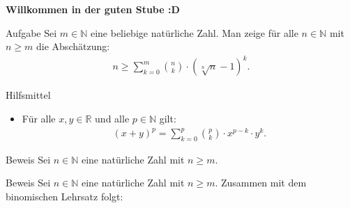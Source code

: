 \documentclass[10pt]{beamer}
\title{}
\author{Artur's Mathematikstübchen}
\date{}
\def\bN{\mathbb{N}}
\def\bR{\mathbb{R}}
\begin{document}

\begin{frame}
    \begin{center}
        \textbf{\huge Willkommen in der guten Stube \newline \newline :D}
    \end{center}
\end{frame}




\begin{frame}{}
    \begin{alertblock}{Aufgabe}
        Sei \( m \in \mathbb{N} \) eine beliebige natürliche Zahl. Man zeige für alle \( n \in \bN \) mit \( n \geq m \) die Abschätzung:
        \begin{align*}
            n
        	\geq \sum_{k = 0}^{m} \binom{n}{k} \cdot \left( \sqrt[n]{n} - 1 \right)^{k}.
        \end{align*}
    \end{alertblock}
\end{frame}



\begin{frame}{Hilfsmittel}
    \begin{itemize}
        \item<1-> Für alle \( x, y \in \bR \) und alle \( p \in \bN \) gilt:  
         \begin{align*}
             \left( x + y \right)^{p}
             = \sum_{k = 0}^{p} \binom{p}{k} \cdot x^{p - k} \cdot y^{k}.
         \end{align*} 
    \end{itemize}
\end{frame}



\begin{frame}{Beweis}
    Sei \( n \in \bN \) eine natürliche Zahl mit \( n \geq m \).
\end{frame}



\begin{frame}{Beweis}
    Sei \( n \in \bN \) eine natürliche Zahl mit \( n \geq m \). Zusammen mit dem binomischen Lehrsatz folgt:
\end{frame}
\end{document}
